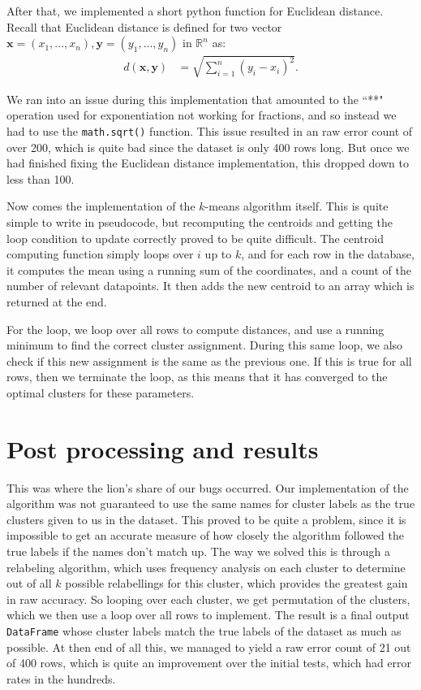 \documentclass[12pt,oneside,reqno]{amsart}
\theoremstyle{plain}
\theoremstyle{definition}
\theoremstyle{remark}
\newcommand{\R}{\mathbb{R}}
\newcommand{\bb}{\vspace{3mm}}
\newcommand{\vecc}{\mathbf}
\newcommand{\bee}{\begin{equation}\begin{aligned}}
\newcommand{\eee}{\end{aligned}\end{equation}}
\newcommand{\inlinecode}{\texttt}
\begin{document}
\bb

After that, we implemented a short python function for Euclidean distance. Recall that Euclidean distance is defined for two vector $\vecc{x} = (x_1,...,x_n),\vecc{y} = (y_1,...,y_n)$ in $\R^n$ as:
\bee
d(\vecc{x},\vecc{y}) &= \sqrt{\sum_{i = 1}^n (y_i - x_i)^2}.
\eee

We ran into an issue during this implementation that amounted to the ``**" operation used for exponentiation not working for fractions, and so instead we had to use the \inlinecode{math.sqrt()} function. This issue resulted in an raw error count of over 200, which is quite bad since the dataset is only 400 rows long. But once we had finished fixing the Euclidean distance implementation, this dropped down to less than 100. 


Now comes the implementation of the $k$-means algorithm itself. This is quite simple to write in pseudocode, but recomputing the centroids and getting the loop condition to update correctly proved to be quite difficult. The centroid computing function simply loops over $i$ up to $k$, and for each row in the database, it computes the mean using a running sum of the coordinates, and a count of the number of relevant datapoints. It then adds the new centroid to an array which is returned at the end. 

For the loop, we loop over all rows to compute distances, and use a running minimum to find the correct cluster assignment. During this same loop, we also check if this new assignment is the same as the previous one. If this is true for all rows, then we terminate the loop, as this means that it has converged to the optimal clusters for these parameters. 

\section{Post processing and results}

This was where the lion's share of our bugs occurred. Our implementation of the algorithm was not guaranteed to use the same names for cluster labels as the true clusters given to us in the dataset. This proved to be quite a problem, since it is impossible to get an accurate measure of how closely the algorithm followed the true labels if the names don't match up. The way we solved this is through a relabeling algorithm, which uses frequency analysis on each cluster to determine out of all $k$ possible relabellings for this cluster, which provides the greatest gain in raw accuracy. So looping over each cluster, we get permutation of the clusters, which we then use a loop over all rows to implement. The result is a final output \inlinecode{DataFrame} whose cluster labels match the true labels of the dataset as much as possible. At then end of all this, we managed to yield a raw error count of 21 out of 400 rows, which is quite an improvement over the initial tests, which had error rates in the hundreds. 
\bb
\end{document}
